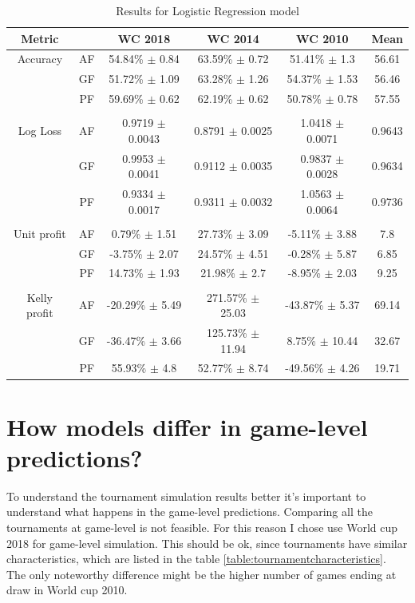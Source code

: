 \begin{table}
    \caption{Results for Logistic Regression model}
    \begin{tabular}{| c  c| c| c| c|c|}
        \hline
        Metric & & \textbf{WC 2018} & \textbf{WC 2014} & \textbf{WC 2010}& Mean\\
        \hline
        Accuracy & AF & 54.84\% $\pm$ 0.84 & 63.59\% $\pm$ 0.72 & 51.41\% $\pm$ 1.3& 56.61 \\
         & GF & 51.72\% $\pm$ 1.09 & 63.28\% $\pm$ 1.26 & 54.37\% $\pm$ 1.53& 56.46 \\
         & PF & 59.69\% $\pm$ 0.62 & 62.19\% $\pm$ 0.62 & 50.78\% $\pm$ 0.78& 57.55 \\
         & & & & & \\
        Log Loss & AF & 0.9719 $\pm$ 0.0043 & 0.8791 $\pm$ 0.0025 & 1.0418 $\pm$ 0.0071& 0.9643 \\
         & GF & 0.9953 $\pm$ 0.0041 & 0.9112 $\pm$ 0.0035 & 0.9837 $\pm$ 0.0028& 0.9634 \\
         & PF & 0.9334 $\pm$ 0.0017 & 0.9311 $\pm$ 0.0032 & 1.0563 $\pm$ 0.0064& 0.9736 \\
         & & & & & \\
        Unit profit & AF & 0.79\% $\pm$ 1.51 & 27.73\% $\pm$ 3.09 & -5.11\% $\pm$ 3.88& 7.8 \\
         & GF & -3.75\% $\pm$ 2.07 & 24.57\% $\pm$ 4.51 & -0.28\% $\pm$ 5.87& 6.85 \\
         & PF & 14.73\% $\pm$ 1.93 & 21.98\% $\pm$ 2.7 & -8.95\% $\pm$ 2.03& 9.25 \\
         & & & & & \\
        Kelly profit & AF & -20.29\% $\pm$ 5.49 & 271.57\% $\pm$ 25.03 & -43.87\% $\pm$ 5.37& 69.14 \\
         & GF & -36.47\% $\pm$ 3.66 & 125.73\% $\pm$ 11.94 & 8.75\% $\pm$ 10.44& 32.67 \\
         & PF & 55.93\% $\pm$ 4.8 & 52.77\% $\pm$ 8.74 & -49.56\% $\pm$ 4.26& 19.71 \\
 \hline
    \end{tabular}
    \label{table:linearmodel}
\end{table}

\section{How models differ in game-level predictions?}
To understand the tournament simulation results better it's important to understand what happens in the game-level predictions. Comparing all the tournaments at game-level is not feasible. For this reason I chose use World cup 2018 for game-level simulation. This should be ok, since tournaments have similar characteristics, which are listed in the table \ref{table:tournamentcharacteristics}. The only noteworthy difference might be the higher number of games ending at draw in World cup 2010.

